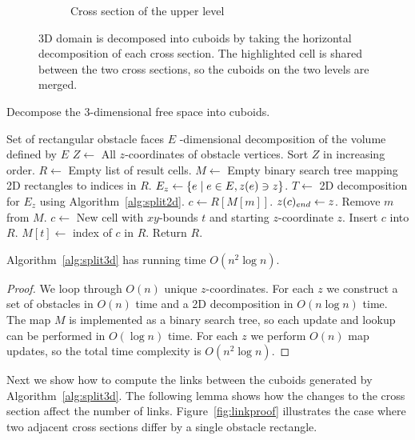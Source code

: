 \documentclass[english,gradu]{tktltiki2018}
\begin{document}
\begin{figure}
\begin{subfigure}[t]{0.3\textwidth}
		\caption{Cross section of the upper level}
	\end{subfigure}
	\caption{3D domain is decomposed into cuboids by taking the horizontal decomposition of each cross section. The highlighted cell is shared between the two cross sections, so the cuboids on the two levels are merged.}\label{fig:split3d}
\end{figure}

\begin{algorithm}
\caption{Decompose the 3-dimensional free space into cuboids.}\label{alg:split3d}
\begin{algorithmic}
\Require Set of rectangular obstacle faces $E$
-dimensional decomposition of the volume defined by $E$
\State $Z\gets$ All $z$-coordinates of obstacle vertices.
\State Sort $Z$ in increasing order.
\State $R\gets$ Empty list of result cells.
\State $M\gets$ Empty binary search tree mapping 2D rectangles to indices in $R$.
	\State $E_z\gets\left\{e \mid e\in E, z(e)\ni z\right\}$.
	\State $T\gets$ 2D decomposition for $E_z$ using Algorithm~\ref{alg:split2d}.
		\State $c\gets R[M[m]]$.
		\State $z(c)_{end}\gets z$.
		\State Remove $m$ from $M$.
	\EndFor
		\State $c\gets$ New cell with $xy$-bounds $t$ and starting $z$-coordinate $z$.
		\State Insert $c$ into $R$.
		\State $M[t]\gets$ index of $c$ in $R$.
	\EndFor
\EndFor
\State Return $R$.
\end{algorithmic}
\end{algorithm}

\begin{lem}\label{lem:split3dtime}Algorithm~\ref{alg:split3d} has running time $O(n^2\log n)$.\end{lem}
\begin{proof}
We loop through $O(n)$ unique $z$-coordinates.
For each $z$ we construct a set of obstacles in $O(n)$ time and a 2D decomposition in $O(n\log n)$ time.
The map $M$ is implemented as a binary search tree, so each update and lookup can be performed in $O(\log n)$ time.
For each $z$ we perform $O(n)$ map updates, so the total time complexity is $O(n^2\log n)$.
\end{proof}

Next we show how to compute the links between the cuboids generated by Algorithm~\ref{alg:split3d}.
The following lemma shows how the changes to the cross section affect the number of links.
Figure~\ref{fig:linkproof} illustrates the case where two adjacent cross sections differ by a single obstacle rectangle.
\end{document}
